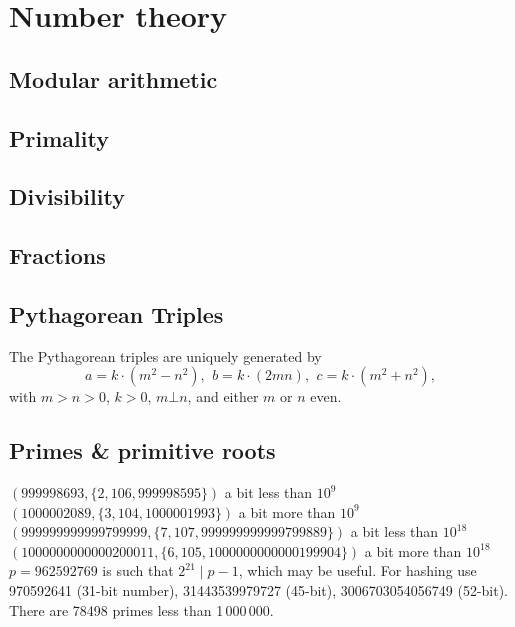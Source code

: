 \chapter{Number theory}

\section{Modular arithmetic}

\section{Primality}

\section{Divisibility}



\section{Fractions}

\section{Pythagorean Triples}
 The Pythagorean triples are uniquely generated by
 \[ a=k\cdot (m^{2}-n^{2}),\ \,b=k\cdot (2mn),\ \,c=k\cdot (m^{2}+n^{2}), \]
 with $m > n > 0$, $k > 0$, $m \bot n$, and either $m$ or $n$ even.

\section{Primes \& primitive roots}
	$(999998693, \{2, 106, 999998595\})$ a bit less than $10^9$
	$(1000002089, \{3, 104, 1000001993\})$ a bit more than $10^9$
	$(999999999999799999, \{7, 107, 999999999999799889\})$ a bit less than $10^18$
	$(1000000000000200011, \{6, 105, 1000000000000199904\})$ a bit more than $10^18$
	$p=962592769$ is such that $2^{21} \mid p-1$, which may be useful. For hashing
	use 970592641 (31-bit number), 31443539979727 (45-bit), 3006703054056749
	(52-bit). There are 78498 primes less than 1\,000\,000.

